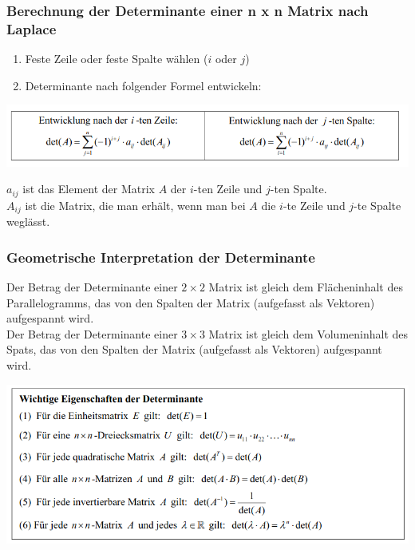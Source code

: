 \subsubsection{Berechnung der Determinante einer n x n Matrix nach Laplace}%
\label{ssub:Berechnung der Determinante einer n x n Matrix nach Laplace}
\begin{enumerate}
  \item Feste Zeile oder feste Spalte wählen ($i$ oder $j$)
  \item Determinante nach folgender Formel entwickeln:
\end{enumerate}
\begin{center}
  \includegraphics[width=0.7\linewidth]{images/determinante_entwickeln.png}
\end{center}
$a_{ij}$ ist das Element der Matrix $A$ der $i$-ten Zeile und $j$-ten Spalte. \\
$A_{ij}$ ist die Matrix, die man erhält, wenn man bei $A$ die $i$-te Zeile und $j$-te Spalte weglässt.

\subsubsection{Geometrische Interpretation der Determinante}%
\label{ssub:Geometrische Interpretation der Determinante}
Der Betrag der Determinante einer $2 \times 2$ Matrix ist gleich dem Flächeninhalt des Parallelogramms, das von den Spalten der Matrix (aufgefasst als Vektoren) aufgespannt wird. \\
Der Betrag der Determinante einer $3 \times 3$ Matrix ist gleich dem Volumeninhalt des Spats, das von den Spalten der Matrix (aufgefasst als Vektoren) aufgespannt wird.

\begin{center}
  \includegraphics[width=0.9\linewidth]{images/determinante_eigenschaften.png}
\end{center}


